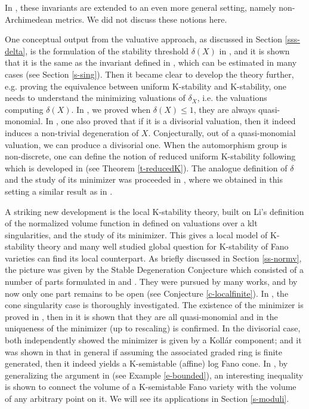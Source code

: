 \documentclass[12pt,reqno]{amsart}%
\theoremstyle{definition}
\theoremstyle{remark}
\begin{document}
In \cite{BHJ17, BBJ15, BoJ18}, these invariants are extended to an even more general setting, namely non-Archimedean metrics. We did not discuss these notions here. 

One conceptual output from the valuative approach, as discussed in Section \ref{sss-delta}, is the formulation of the stability threshold $\delta(X)$ in \cite{BJ20}, and it is shown that it is the same as the invariant defined in \cite{FO18}, which can be estimated in many cases (see Section \ref{s-sing}). Then it became clear to develop the theory further, e.g. proving the equivalence between uniform K-stability and K-stability, one needs to understand the minimizing valuations of $\delta_X$, i.e. the valuations computing $\delta(X)$. In \cite{BLX19}, we proved when $\delta(X)\le 1$, they are always quasi-monomial. In \cite{BX19, BLZ19}, one also proved that if it is a divisorial valuation, then it indeed induces a non-trivial degeneration of $X$. Conjecturally, out of a quasi-monomial valuation, we can produce a divisorial one. When the automorphism group is non-discrete, one can define the notion of reduced uniform K-stability following \cite{His16} which is developed in \cite{Li19, XZ19} (see Theorem \ref{t-reducedK}). The analogue definition of $\delta$ and the study of its minimizer was proceeded in \cite{XZ19}, where we obtained  in this setting a similar result as in \cite{BLX19}.

A striking new development is the local K-stability theory, built on Li's definition of the normalized volume function in \cite{Li18} defined on valuations over a klt singularities, and the study of its minimizer. This gives a local model of K-stability theory and many well studied global question for K-stability of Fano varieties can find its local counterpart. As briefly discussed in Section \ref{ss-normv}, the picture was given by the Stable Degeneration Conjecture which consisted of a number of parts formulated in \cite{Li18} and \cite{LX18}. They were pursued by many works, and by now only one part remains to be open (see Conjecture \ref{c-localfinite}). In \cite{Li17, LL19, LX20}, the cone singularity case is thoroughly  investigated. The existence of the minimizer is proved in \cite{Blu18}, then in \cite{Xu19} it is shown that they are all quasi-monomial and in \cite{XZ20}  the uniqueness of the minimizer (up to rescaling) is confirmed. In the divisorial case, both \cite{LX20, Blu18} independently showed the minimizer is given by a Koll\'ar component; and it was shown in \cites{LX18, LX20}  that in general if assuming the associated graded ring is finite generated, then it indeed yields a K-semistable (affine) log Fano cone. In \cite{Liu18}, by generalizing the argument in  \cite{Fuj18} (see Example \ref{e-bounded}), an interesting inequality is shown to connect the volume of a K-semistable Fano variety with the volume of any arbitrary point on it. We will see its applications in Section \ref{s-moduli}. 
\end{document}
